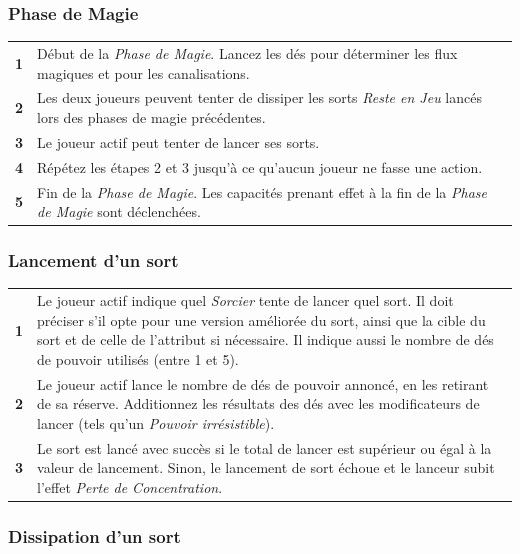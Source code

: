 \newpage
\begin{table}[h!]
\begin{minipage}[t]{.5\linewidth}
\footnotesize

\subsubsection*{Phase de Magie}

\begin{tabular}{c|m{6.8cm}}
\textbf{1} & Début de la \emph{Phase de Magie}. Lancez les dés pour déterminer les flux magiques et pour les canalisations. \tabularnewline
\textbf{2} & Les deux joueurs peuvent tenter de dissiper les sorts \emph{Reste en Jeu} lancés lors des phases de magie précédentes. \tabularnewline
\textbf{3} & Le joueur actif peut tenter de lancer ses sorts. \tabularnewline
\textbf{4} & Répétez les étapes 2 et 3 jusqu'à ce qu'aucun joueur ne fasse une action. \tabularnewline
\textbf{5} & Fin de la \emph{Phase de Magie}. Les capacités prenant effet à la fin de la \emph{Phase de Magie} sont déclenchées. \tabularnewline
\end{tabular}

\subsubsection*{Lancement d'un sort}

\begin{tabular}{c|m{6.8cm}}
\textbf{1} & Le joueur actif indique quel \emph{Sorcier} tente de lancer quel sort. Il doit préciser s'il opte pour une version améliorée du sort, ainsi que la cible du sort et de celle de l'attribut si nécessaire. Il indique aussi le nombre de dés de pouvoir utilisés (entre 1 et 5). \tabularnewline
\textbf{2} & Le joueur actif lance le nombre de dés de pouvoir annoncé, en les retirant de sa réserve. Additionnez les résultats des dés avec les modificateurs de lancer (tels qu'un \emph{Pouvoir irrésistible}). \tabularnewline
\textbf{3} & Le sort est lancé avec succès si le total de lancer est supérieur ou égal à la valeur de lancement. Sinon, le lancement de sort échoue et le lanceur subit l'effet \emph{Perte de Concentration}. \tabularnewline
\end{tabular}

\subsubsection*{Dissipation d'un sort}


\end{minipage}
\end{table}

